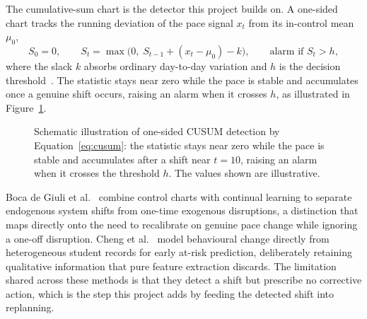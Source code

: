 The cumulative-sum chart is the detector this project builds on. A one-sided chart tracks the running deviation of the pace signal $x_t$ from its in-control mean $\mu_0$,
\begin{equation}
S_0 = 0, \qquad S_t = \max\!\big(0,\; S_{t-1} + (x_t-\mu_0) - k\big), \qquad \text{alarm if } S_t > h,
\label{eq:cusum}
\end{equation}
where the slack $k$ absorbs ordinary day-to-day variation and $h$ is the decision threshold~\cite{qiao2026}. The statistic stays near zero while the pace is stable and accumulates once a genuine shift occurs, raising an alarm when it crosses $h$, as illustrated in Figure~\ref{fig:cusum}.

\begin{figure}[htbp]
\centering
{}
\caption{Schematic illustration of one-sided CUSUM detection by Equation~\eqref{eq:cusum}: the statistic stays near zero while the pace is stable and accumulates after a shift near $t=10$, raising an alarm when it crosses the threshold $h$. The values shown are illustrative.}
\label{fig:cusum}
\end{figure}

Boca de Giuli et al.~\cite{boca2024} combine control charts with continual learning to separate endogenous system shifts from one-time exogenous disruptions, a distinction that maps directly onto the need to recalibrate on genuine pace change while ignoring a one-off disruption. Cheng et al.~\cite{cheng2024} model behavioural change directly from heterogeneous student records for early at-risk prediction, deliberately retaining qualitative information that pure feature extraction discards. The limitation shared across these methods is that they detect a shift but prescribe no corrective action, which is the step this project adds by feeding the detected shift into replanning.

